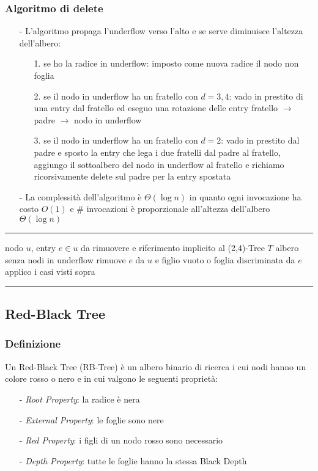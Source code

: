 \documentclass[a4paper]{article}
\makeatletter
\newenvironment{algo}[4]{
	\noindent\rule{\textwidth}{0.4pt}
	\begin{algorithmic}[1]
		\addtocounter{ALG@line}{-1}
		\Procedure{#1}{#2}
		\Require #3
		\Ensure #4
		\Statex }{
		\EndProcedure
	\end{algorithmic}
	\rule{\textwidth}{0.4pt}}
\makeatother
\begin{document}
\subsubsection*{Algoritmo di delete}
\begin{itemize}[topsep=3pt, itemsep=0pt]
	\item[-] L'algoritmo propaga l'underflow verso l'alto e se serve diminuisce l'altezza dell'albero:
	\begin{itemize}[topsep=0pt, itemsep=0pt]
		\item[1.] se ho la radice in underflow: imposto come nuova radice il nodo non foglia
		\item[2.] se il nodo in underflow ha un fratello con \(d = 3,4\): vado in prestito di una entry dal fratello ed eseguo
		una rotazione delle entry fratello \(\rightarrow\) padre \(\rightarrow\) nodo in underflow
		\item[3.] se il nodo in underflow ha un fratello con \(d = 2\): vado in prestito dal padre e sposto la entry che lega i
		due fratelli dal padre al fratello,	aggiungo il sottoalbero del nodo in underflow al fratello e richiamo ricorsivamente
		delete sul padre per la entry spostata
	\end{itemize}
	\item[-] La complessità dell'algoritmo è \(\Theta(\log n)\) in quanto ogni invocazione ha costo \(O(1)\) e \# invocazioni
	è proporzionale all'altezza dell'albero \(\Theta(\log n)\)
\end{itemize}
\begin{algo}{delete}{$u$, $e$}{nodo $u$, entry $e \in u$ da rimuovere e riferimento implicito al (2,4)-Tree $T$}{albero senza nodi in underflow}
	\State rimuove $e$ da $u$ e figlio vuoto o foglia discriminata da $e$
	\State applico i casi visti sopra
\end{algo}

\vspace{4em}

\subsection{Red-Black Tree}
\subsubsection*{Definizione}
Un Red-Black Tree (RB-Tree) è un albero binario di ricerca i cui nodi hanno un colore rosso o nero e in cui valgono le seguenti
proprietà:
\begin{itemize}[topsep=3pt, itemsep=0pt]
	\item[-] \textit{Root Property}: la radice è nera
	\item[-] \textit{External Property}: le foglie sono nere
	\item[-] \textit{Red Property}: i figli di un nodo rosso sono necessario
	\item[-] \textit{Depth Property}: tutte le foglie hanno la stessa Black Depth
\end{itemize}
\end{document}
